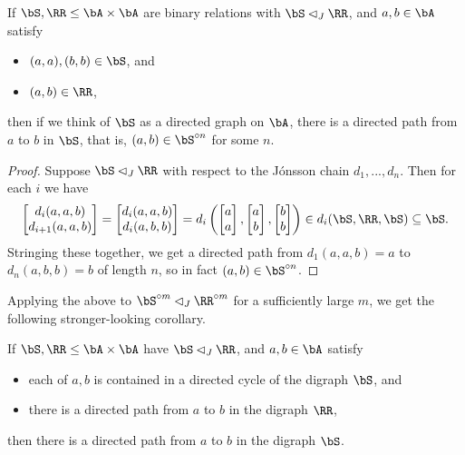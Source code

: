 \begin{thm}\label{absorbing-directed-path} If $\bS, \RR \le \bA \times \bA$ are binary relations with $\bS \lhd_J \RR$, and $a,b \in \bA$ satisfy
\begin{itemize}
\item $(a,a), (b,b) \in \bS$, and

\item $(a,b) \in \RR$,
\end{itemize}
then if we think of $\bS$ as a directed graph on $\bA$, there is a directed path from $a$ to $b$ in $\bS$, that is, $(a,b) \in \bS^{\circ n}$ for some $n$.
\end{thm}
\begin{proof} Suppose $\bS \lhd_J \RR$ with respect to the J\'onsson chain $d_1, ..., d_n$. Then for each $i$ we have
\[
\begin{bmatrix} d_i(a,a,b)\\ d_{i+1}(a,a,b) \end{bmatrix} = \begin{bmatrix} d_i(a,a,b)\\ d_i(a,b,b) \end{bmatrix} = d_i\left(\begin{bmatrix} a\\ a \end{bmatrix}, \begin{bmatrix} a\\ b \end{bmatrix}, \begin{bmatrix} b\\ b \end{bmatrix}\right) \in d_i(\bS, \RR, \bS) \subseteq \bS.
\]
Stringing these together, we get a directed path from $d_1(a,a,b) = a$ to $d_n(a,b,b) = b$ of length $n$, so in fact $(a,b) \in \bS^{\circ n}$.
\end{proof}

Applying the above to $\bS^{\circ m} \lhd_J \RR^{\circ m}$ for a sufficiently large $m$, we get the following stronger-looking corollary.

\begin{cor}\label{cor-absorbing-directed-path} If $\bS, \RR \le \bA \times \bA$ have $\bS \lhd_J \RR$, and $a,b \in \bA$ satisfy
\begin{itemize}
\item each of $a,b$ is contained in a directed cycle of the digraph $\bS$, and

\item there is a directed path from $a$ to $b$ in the digraph $\RR$,
\end{itemize}
then there is a directed path from $a$ to $b$ in the digraph $\bS$.
\end{cor}

